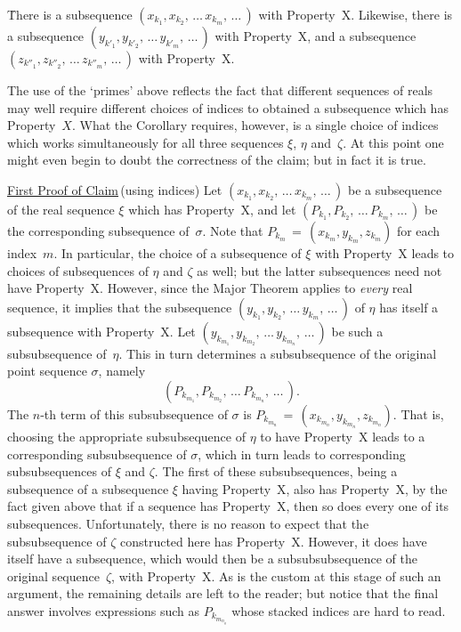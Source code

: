         \h There is a subsequence $(x_{k_{1}}, x_{k_{2}},\,{\ldots}\,x_{k_{m}},\,{\ldots}\,)$ with Property~X. Likewise,
        there is a subsequence $(y_{k'_{1}}, y_{k'_{2}},\,{\ldots}\,y_{k'_{m}},\,{\ldots}\,)$ with Property~X,
    and a subsequence $(z_{k''_{1}}, z_{k''_{2}},\,{\ldots}\,z_{k''_{m}},\,{\ldots}\,)$ with Property~X.

\VA

\noindent The use of the `primes' above reflects the fact that different sequences of reals
    may well require different choices of indices to obtained a subsequence which has Property~$X$.
    What the Corollary requires, however, is a single choice of indices which works simultaneously for all three sequences ${\xi}$, ${\eta}$ and~${\zeta}$.
    At this point one might even begin to doubt the correctness of the claim; but in fact it is true.

\V

        \underline{First Proof of Claim}\,(using indices) Let $(x_{k_{1}}, x_{k_{2}},\,{\ldots}\,x_{k_{m}},\,{\ldots}\,)$
    be a subsequence of the real sequence ${\xi}$ which has Property~X, and let $(P_{k_{1}}, P_{k_{2}},\,{\ldots}\,P_{k_{m}},\,{\ldots}\,)$
    be the corresponding subsequence of~${\sigma}$. Note that $P_{k_{m}} \,=\, (x_{k_{m}}, y_{k_{m}}, z_{k_{m}})$ for each index~$m$.
    In particular, the choice of a subsequence of ${\xi}$ with Property~X leads to choices of subsequences of ${\eta}$ and ${\zeta}$ as well;
    but the latter subsequences need not have Property~X. However, since the Major Theorem applies to {\em every} real sequence,
    it implies that the subsequence $(y_{k_{1}}, y_{k_{2}},\,{\ldots}\,y_{k_{m}},\,{\ldots}\,)$
    of ${\eta}$ has itself a subsequence with Property~X. Let $(y_{k_{m_{1}}}, y_{k_{m_{2}}},\,{\ldots}\,y_{k_{m_{n}}},\,{\ldots}\,)$
    be such a subsubsequence of~${\eta}$. This in turn determines a subsubsequence of the original point sequence ${\sigma}$, namely
        \begin{displaymath}
        \left(P_{k_{m_{1}}}, P_{k_{m_{2}}},\,{\ldots}\,P_{k_{m_{n}}},\,{\ldots}\,\right).
        \end{displaymath}
    The $n$-th term of this subsubsequence of ${\sigma}$ is $P_{k_{m_{n}}} \,=\, \left(x_{k_{m_{n}}}, y_{k_{m_{n}}}, z_{k_{m_{n}}}\right)$.
    That is, choosing the appropriate subsubsequence of ${\eta}$ to have Property~X leads to a corresponding subsubsequence of ${\sigma}$,
    which in turn leads to corresponding subsubsequences of ${\xi}$ and ${\zeta}$.
    The first of these subsubsequences, being a subsequence of a subsequence ${\xi}$ having Property~X,
    also has Property~X, by the fact given above that if a sequence has Property~X, then so does every one of its subsequences.
    Unfortunately, there is no reason to expect that the subsubsequence of ${\zeta}$ constructed here has Property~X.
    However, it does have itself have a subsequence, which would then be a subsubsubsequence of the original sequence~${\zeta}$, with Property~X.
    As is the custom at this stage of such an argument, the remaining details are left to the reader;
    but notice that the final answer involves expressions such as $P_{k_{m_{n_{q}}}}$ whose stacked indices are hard to read.

